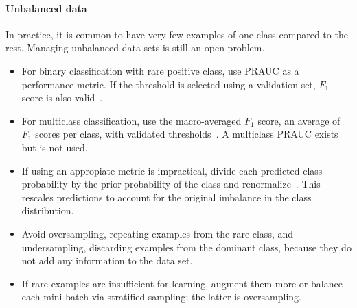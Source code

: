 \paragraph{Unbalanced data}
In practice, it is common to have very few examples of one class compared to the rest. Managing unbalanced data sets is still an open problem.%
\begin{itemize}
	\item For binary classification with rare positive class, use PRAUC as a performance metric. If the threshold is selected using a validation set, $F_1$ score is also valid~\cite{Davis2006}.

	\item For multiclass classification, use the macro-averaged $F_1$ score, an average of $F_1$ scores per class, with validated thresholds~\cite{Ozgur2005}. A multiclass PRAUC exists but is not used.

	\item If using an appropiate metric is impractical, divide each predicted class probability by the prior probability of the class and renormalize~\cite{Bishop1995}. This rescales predictions to account for the original imbalance in the class distribution.

	\item Avoid oversampling, repeating examples from the rare class, and undersampling, discarding examples from the dominant class, because they do not add any information to the data set.

	\item If rare examples are insufficient for learning, augment them more or balance each mini-batch via stratified sampling; the latter is oversampling.%

\end{itemize}

